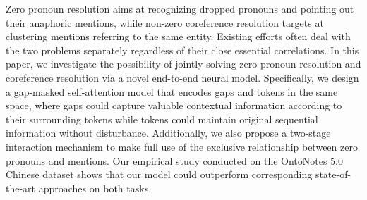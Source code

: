 Zero pronoun resolution aims at recognizing dropped pronouns and pointing out their anaphoric mentions, while non-zero coreference resolution targets at clustering mentions referring to the same entity. Existing efforts often deal with the two problems separately regardless of their close essential correlations. In this paper, we investigate the possibility of jointly solving zero pronoun resolution and coreference resolution via a novel end-to-end neural model. Specifically, we design a gap-masked self-attention model that encodes gaps and tokens in the same space, where gaps could capture valuable contextual information according to their surrounding tokens while tokens could maintain original sequential information without disturbance. Additionally, we also propose a two-stage interaction mechanism to make full use of the exclusive relationship between zero pronouns and mentions. Our empirical study conducted on the OntoNotes 5.0 Chinese dataset shows that our model could outperform corresponding state-of-the-art approaches on both tasks.
